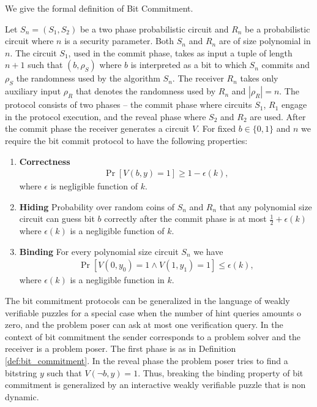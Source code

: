\documentclass[11pt,a4paper,titlepage]{memoir}
\begin{document}
We give the formal definition of Bit Commitment.
\begin{definition}
  \label{def:bit_commitment}
Let $S_n = (S_1, S_2)$ be a two phase probabilistic circuit and $R_n$ be a probabilistic circuit where $n$ is a security parameter.
Both $S_n$ and $R_n$ are of size polynomial in $n$.
The circuit $S_1$, used in the commit phase, takes as input a tuple of length $n+1$ such that $(b, \rho_S)$ where $b$ is interpreted as a bit to which $S_n$
commits and $\rho_S$ the randomness used by the algorithm $S_n$. The receiver $R_n$ takes only auxiliary input $\rho_R$ that denotes the
randomness used by $R_n$ and $|\rho_R| = n$.
The protocol consists of two phases -- the commit phase where circuits $S_1$, $R_1$ engage in the protocol execution,
and the reveal phase where $S_2$ and $R_2$ are used.
After the commit phase the receiver generates a circuit $V$.
For fixed $b \in \{0,1\}$ and $n$ we require the bit commit protocol to have the following properties:
\begin{enumerate}[]
\item{\textnormal{\textbf{Correctness}}}
  \begin{align*}
    \Pr[V(b,y) = 1] \geq 1 - \epsilon(k),
  \end{align*}
where $\epsilon$ is negligible function of $k$.
\item{\textnormal{\textbf{Hiding}}}
  Probability over random coins of $S_n$ and $R_n$ that any polynomial size circuit
  can guess bit $b$ correctly after the commit phase is at most $\frac{1}{2} + \epsilon(k)$ where $\epsilon(k)$ is a negligible function of $k$.
\item{\textnormal{\textbf{Binding}}}
  For every polynomial size circuit $S_n$ we have
  \begin{align*}
    \Pr[V(0,y_0) = 1 \land V(1,y_1) = 1] \leq \epsilon(k),
  \end{align*}
  where $\epsilon(k)$ is a negligible function in $k$.
\end{enumerate}
\end{definition}

The bit commitment protocols can be generalized in the language of weakly verifiable puzzles for a special
case when the number of hint queries amounts o zero, and the problem poser can ask at most one verification query.
In the context of bit commitment the sender corresponds to a problem solver and the receiver is a problem poser.
The first phase is as in Definition \ref{def:bit_commitment}. In the reveal phase the problem poser tries to find a bitstring $y$
such that $V(\lnot b, y) = 1$.
Thus, breaking the binding property of bit commitment is generalized by an interactive weakly verifiable puzzle that is non dynamic.
\end{document}
